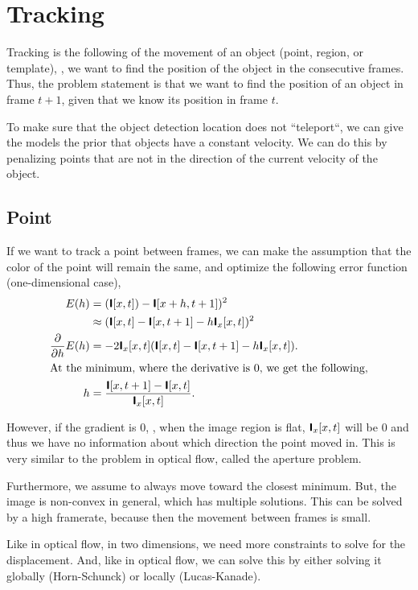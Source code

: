 \section{Tracking} \label{sec:tracking}

Tracking is the following of the movement of an object (point, region, or
template), \ie, we want to find the position of the object in the consecutive
frames. Thus, the problem statement is that we want to find the position of an
object in frame $t+1$, given that we know its position in frame $t$.

To make sure that the object detection location does not ``teleport``, we can
give the models the prior that objects have a constant velocity. We can do this by
penalizing points that are not in the direction of the current velocity of the
object.

\subsection{Point}

If we want to track a point between frames, we can make the assumption that the
color of the point will remain the same, and optimize the following error
function (one-dimensional case),
\begin{align*}
  E(h) &= ( \bm{\mathsf{I}}[x,t]) - \bm{\mathsf{I}}[x+h,t+1] )^2 \\
  &\approx ( \bm{\mathsf{I}}[x,t] - \bm{\mathsf{I}}[x,t+1] - h\bm{\mathsf{I}}_x[x,t])^2 \\
  \pdv*{E(h)}{h} &= -2 \bm{\mathsf{I}}_x[x,t] ( \bm{\mathsf{I}}[x,t] - \bm{\mathsf{I}}[x,t+1] - h\bm{\mathsf{I}}_x[x,t]). \\
  \intertext{At the minimum, where the derivative is 0, we get the following,}
  h &= \frac{\bm{\mathsf{I}}[x,t+1] - \bm{\mathsf{I}}[x,t]}{\bm{\mathsf{I}}_x[x,t]}
.\end{align*}

However, if the gradient is 0, \ie, when the image region is flat,
$\bm{\mathsf{I}}_x[x,t]$ will be 0 and thus we have no information about which
direction the point moved in. This is very similar to the problem in optical
flow, called the aperture problem.

Furthermore, we assume to always move toward the closest minimum. But, the
image is non-convex in general, which has multiple solutions. This can be
solved by a high framerate, because then the movement between frames is small.

Like in optical flow, in two dimensions, we need more constraints to solve for
the displacement. And, like in optical flow, we can solve this by either
solving it globally (Horn-Schunck) or locally (Lucas-Kanade).

